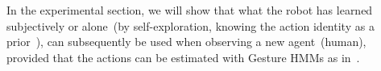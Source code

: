 %
%
%
%
In the experimental section, we will show that what the robot has learned subjectively or alone~(by self-exploration, knowing the action identity as a prior~\cite{salvi:2012:smcb}), can subsequently be used when observing a new agent~(human), provided that the actions can be estimated with Gesture \acp{HMM} as in~\cite{saponaro:2013:crhri}.
